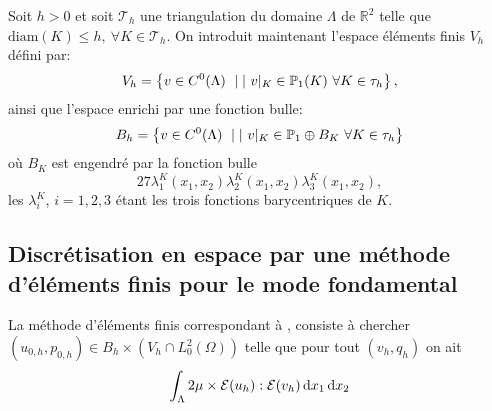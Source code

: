 
Soit $h > 0$ et soit $\mathcal T_h$ une triangulation du domaine
$\Lambda$ de $\mathbb R^2$
telle que $\mathrm{diam}(K) \leq h,\ \forall K\in\mathcal T_h$. On introduit
maintenant l'espace éléments finis $V_h$ défini par:
\begin{equation}
V_h = \left\{ v \in C^0(\Lambda) \ \mid|\  v|_K \in \mathbb
  P_1(K)\ \forall K\in \tau_h \right\},
\end{equation}
ainsi que l'espace enrichi par une fonction bulle:
\begin{equation}
  B_h = \left\{ v \in C^0(\Lambda)\ \mid|\  v|_{K} \in \mathbb
    P_1\oplus B_K\ \forall K\in\tau_h \right\}
\end{equation}
où $B_K$ est engendré par la fonction
bulle
\begin{equation}
  27\lambda_1^K(x_1,x_2)\lambda_2^K(x_1,x_2)\lambda_3^K(x_1, x_2),
\end{equation}
les $\lambda_i^K$, $i = 1,2,3$ étant les trois fonctions
barycentriques de $K$.

\subsection{Discrétisation en espace par une méthode d'éléments finis
  pour le mode fondamental}\label{sec:fourier-discretisation-fundamental}
La méthode d'éléments finis correspondant à \cite{}, \cite{} consiste
à chercher $(u_{0,h}, p_{0,h})\in B_h\times(V_h\cap L_0^2(\Omega))$
telle que pour tout $(v_h, q_h)$ on ait
\begin{equation}
\int_\Lambda 2\mu\times \mathcal E(u_h):\mathcal E (v_h)\,\mathrm dx_1\,\mathrm dx_2
\end{equation}




